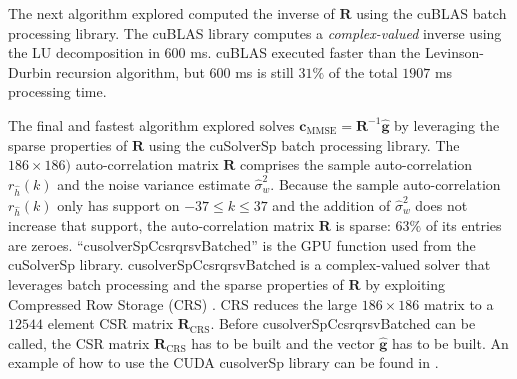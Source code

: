 The next algorithm explored computed the inverse of $\mathbf{R}$ using the cuBLAS batch processing library.
The cuBLAS library computes a \textit{complex-valued} inverse using the LU decomposition in $600$ ms.
cuBLAS executed faster than the Levinson-Durbin recursion algorithm, but $600$ ms is still $31\%$ of the total $1907$ ms processing time.

The final and fastest algorithm explored solves $\mathbf{c}_\text{MMSE} = \mathbf{R}^{-1} \hat{\mathbf{g}}$ by leveraging the sparse properties of $\mathbf{R}$ using the cuSolverSp batch processing library.
The $ 186 \times 186)$ auto-correlation matrix $\mathbf{R}$ comprises the sample auto-correlation $r_{\hat{h}}(k)$ and the noise variance estimate $\hat{\sigma}^2_w$.
Because the sample auto-correlation $r_{\hat{h}}(k)$ only has support on $-37 \leq k \leq 37$ and the addition of $\hat{\sigma}^2_w$ does not increase that support, the auto-correlation matrix $\mathbf{R}$ is sparse: $63\%$ of its entries are zeroes.
``cusolverSpCcsrqrsvBatched'' is the GPU function used from the cuSolverSp library.
cusolverSpCcsrqrsvBatched is a complex-valued solver that leverages batch processing and the sparse properties of $\mathbf{R}$ by exploiting Compressed Row Storage (CRS) \cite{wiki:Sparse_matrix}.
CRS reduces the large $186\times186$ matrix to a $12544$ element CSR matrix $\mathbf{R}_{\text{CRS}}$.
Before cusolverSpCcsrqrsvBatched can be called, the CSR matrix $\mathbf{R}_{\text{CRS}}$ has to be built and the vector $\hat{\mathbf{g}}$ has to be built.
An example of how to use the CUDA cusolverSp library can be found in \cite{CUDA_toolkit_doc}.

